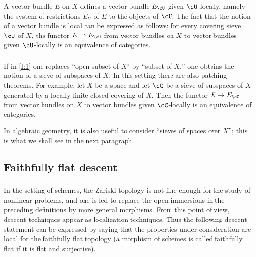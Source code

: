 \subsubsection{}\label{I:1-3-3}

A vector bundle $E$ on $X$ defines a vector bundle $E_\cU$ given
$\cU$-locally, namely the system of restrictions $E_U$ of $E$ to the
objects of $\cU$. The fact that the notion of a vector bundle is local can
be expressed as follows: for every covering sieve $\cU$ of $X$, the
functor $E\mapsto E_\cU$ from vector bundles on $X$ to vector bundles
given $\cU$-locally is an equivalence of categories.

\subsubsection{}\label{I:1-3-4}

If in \ref{I:1} one replaces “open subset of $X$” by “subset of $X$,”
one obtains the notion of a sieve of subspaces of $X$. In this setting
there are also patching theorems. For example, let $X$ be a space and
let $\cC$ be a sieve of subspaces of $X$ generated by a locally finite
closed covering of $X$. Then the functor $E\mapsto E_\cC$ from vector
bundles on $X$ to vector bundles given $\cC$-locally is an equivalence
of categories.

In algebraic geometry, it is also useful to consider “sieves of spaces
over $X$”; this is what we shall see in the next paragraph.

\subsection{Faithfully flat descent}\label{I:1-4}

\subsubsection{}\label{I:1-4-1}

In the setting of schemes, the Zariski topology is not fine enough for the
study of nonlinear problems, and one is led to replace the open immersions
in the preceding definitions by more general morphisms. From this point of
view, descent techniques appear as localization techniques. Thus the
following descent statement can be expressed by saying that the properties
under consideration are local for the faithfully flat topology (a morphism
of schemes is called faithfully flat if it is flat and surjective).

